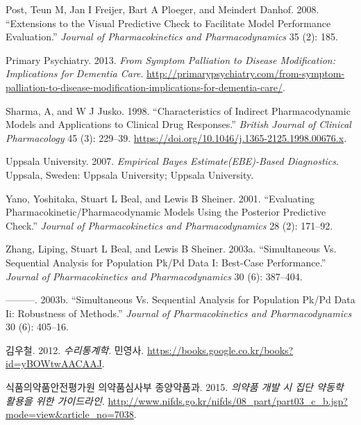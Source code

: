 \documentclass[
  10pt,
  krantz2,
  a4paper]{krantz}
\newlength{\cslhangindent}
\newenvironment{cslreferences}%
  {\setlength{\parindent}{0pt}%
  \everypar{\setlength{\hangindent}{\cslhangindent}}\ignorespaces}%
  {\par}
\theoremstyle{definition}
\theoremstyle{definition}
\theoremstyle{definition}
\theoremstyle{remark}
\begin{document}
\begin{cslreferences}
\leavevmode\hypertarget{ref-post2008extensions}{}%
Post, Teun M, Jan I Freijer, Bart A Ploeger, and Meindert Danhof. 2008. ``Extensions to the Visual Predictive Check to Facilitate Model Performance Evaluation.'' \emph{Journal of Pharmacokinetics and Pharmacodynamics} 35 (2): 185.

\leavevmode\hypertarget{ref-dementia}{}%
Primary Psychiatry. 2013. \emph{From Symptom Palliation to Disease Modification: Implications for Dementia Care}. \url{http://primarypsychiatry.com/from-symptom-palliation-to-disease-modification-implications-for-dementia-care/}.

\leavevmode\hypertarget{ref-sharma1998characteristics}{}%
Sharma, A, and W J Jusko. 1998. ``Characteristics of Indirect Pharmacodynamic Models and Applications to Clinical Drug Responses.'' \emph{British Journal of Clinical Pharmacology} 45 (3): 229--39. \url{https://doi.org/10.1046/j.1365-2125.1998.00676.x}.

\leavevmode\hypertarget{ref-uppsala}{}%
Uppsala University. 2007. \emph{Empirical Bayes Estimate(EBE)-Based Diagnostics}. Uppsala, Sweden: Uppsala University; Uppsala University.

\leavevmode\hypertarget{ref-yano2001evaluating}{}%
Yano, Yoshitaka, Stuart L Beal, and Lewis B Sheiner. 2001. ``Evaluating Pharmacokinetic/Pharmacodynamic Models Using the Posterior Predictive Check.'' \emph{Journal of Pharmacokinetics and Pharmacodynamics} 28 (2): 171--92.

\leavevmode\hypertarget{ref-zhang1}{}%
Zhang, Liping, Stuart L Beal, and Lewis B Sheiner. 2003a. ``Simultaneous Vs. Sequential Analysis for Population Pk/Pd Data I: Best-Case Performance.'' \emph{Journal of Pharmacokinetics and Pharmacodynamics} 30 (6): 387--404.

\leavevmode\hypertarget{ref-zhang2}{}%
---------. 2003b. ``Simultaneous Vs. Sequential Analysis for Population Pk/Pd Data Ii: Robustness of Methods.'' \emph{Journal of Pharmacokinetics and Pharmacodynamics} 30 (6): 405--16.

\leavevmode\hypertarget{ref-kim}{}%
김우철. 2012. \emph{수리통계학}. 민영사. \url{https://books.google.co.kr/books?id=yBOWtwAACAAJ}.

\leavevmode\hypertarget{ref-poppk}{}%
식품의약품안전평가원 의약품심사부 종양약품과. 2015. \emph{의약품 개발 시 집단 약동학 활용을 위한 가이드라인}. \url{http://www.nifds.go.kr/nifds/08_part/part03_c_b.jsp?mode=view\&article_no=7038}.
\end{cslreferences}

\printindex
\end{document}
